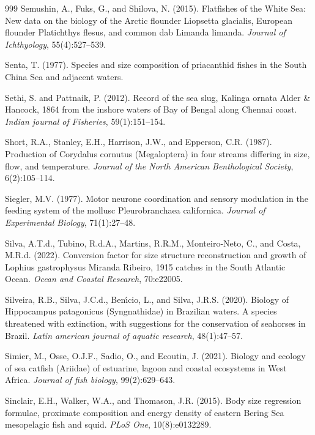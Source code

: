 \begin{thebibliography}{999}
Semushin, A., Fuks, G., and Shilova, N. (2015). Flatfishes of the White Sea: New data on the biology of the Arctic flounder Liopsetta glacialis, European flounder Platichthys flesus, and common dab Limanda limanda. \textit{Journal of Ichthyology}, 55(4):527--539.

Senta, T. (1977). Species and size composition of priacanthid fishes in the South China Sea and adjacent waters.

Sethi, S. and Pattnaik, P. (2012). Record of the sea slug, Kalinga ornata Alder \& Hancock, 1864 from the inshore waters of Bay of Bengal along Chennai coast. \textit{Indian journal of Fisheries}, 59(1):151--154.

Short, R.A., Stanley, E.H., Harrison, J.W., and Epperson, C.R. (1987). Production of Corydalus cornutus (Megaloptera) in four streams differing in size, flow, and temperature. \textit{Journal of the North American Benthological Society}, 6(2):105--114.

Siegler, M.V. (1977). Motor neurone coordination and sensory modulation in the feeding system of the mollusc Pleurobranchaea californica. \textit{Journal of Experimental Biology}, 71(1):27--48.

Silva, A.T.d., Tubino, R.d.A., Martins, R.R.M., Monteiro-Neto, C., and Costa, M.R.d. (2022). Conversion factor for size structure reconstruction and growth of Lophius gastrophysus Miranda Ribeiro, 1915 catches in the South Atlantic Ocean. \textit{Ocean and Coastal Research}, 70:e22005.

Silveira, R.B., Silva, J.C.d., Ben{\'\i}cio, L., and Silva, J.R.S. (2020). Biology of Hippocampus patagonicus (Syngnathidae) in Brazilian waters. A species threatened with extinction, with suggestions for the conservation of seahorses in Brazil. \textit{Latin american journal of aquatic research}, 48(1):47--57.

Simier, M., Osse, O.J.F., Sadio, O., and Ecoutin, J. (2021). Biology and ecology of sea catfish (Ariidae) of estuarine, lagoon and coastal ecosystems in West Africa. \textit{Journal of fish biology}, 99(2):629--643.

Sinclair, E.H., Walker, W.A., and Thomason, J.R. (2015). Body size regression formulae, proximate composition and energy density of eastern Bering Sea mesopelagic fish and squid. \textit{PLoS One}, 10(8):e0132289.


\end{thebibliography}
